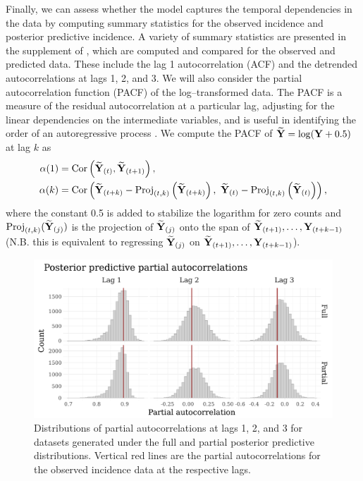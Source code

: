 Finally, we can assess whether the model captures the temporal dependencies in the data by computing summary statistics for the observed incidence and posterior predictive incidence. A variety of summary statistics are presented in the supplement of \cite{king2015avoidable}, which are computed and compared for the observed and predicted data. These include the lag 1 autocorrelation (ACF) and the detrended autocorrelations at lags 1, 2, and 3. We will also consider the partial autocorrelation function (PACF) of the log--transformed data. The PACF is a measure of the residual autocorrelation at a particular lag, adjusting for the linear dependencies on the intermediate variables, and is useful in identifying the order of an autoregressive process \cite{brockwell2013time}. We compute the PACF of $ \widetilde{\mathbf{Y}} = \log(\mathbf{Y} + 0.5) $ at lag $ k $ as 
\begin{align}
\label{eqn:lna_pacf}
\alpha(1)& =  \mathrm{Cor}\left (\widetilde{\mathbf{Y}}_{(t)}, \widetilde{\mathbf{Y}}_{(t+1)}\right ), \\
\alpha(k) &= \mathrm{Cor}\left (\widetilde{\mathbf{Y}}_{(t+k)} - \mathrm{Proj}_{(t,k)}\left (\widetilde{\mathbf{Y}}_{(t+k)}\right ),\ \widetilde{\mathbf{Y}}_{(t)} - \mathrm{Proj}_{(t,k)}\left (\widetilde{\mathbf{Y}}_{(t)}\right )\right ),
\end{align}
where the constant 0.5 is added to stabilize the logarithm for zero counts and $ \mathrm{Proj}_{(t,k)}(\widetilde{\mathbf{Y}}_{(j)}) $ is the projection of $ \widetilde{\mathbf{Y}}_{(j)} $ onto the span of $ \widetilde{\mathbf{Y}}_{(t+1)},\dots,\mathbf{Y}_{(t+k-1)} $ (N.B. this is equivalent to regressing $ \widetilde{\mathbf{Y}}_{(j)} $ on $ \widetilde{\mathbf{Y}}_{(t+1)},\dots,\mathbf{Y}_{(t+k-1)} $).  

\begin{figure}[htbp]
	\centering
	\includegraphics[width=0.9\linewidth]{figures/sir_pacf_plots}
	\caption[Posterior predictive distributions of partial autocorrelations at various lags.]{Distributions of partial autocorrelations at lags 1, 2, and 3 for datasets generated under the full and partial posterior predictive distributions. Vertical red lines are the partial autocorrelations for the observed incidence data at the respective lags.}
	\label{fig:sirpacfplots}
\end{figure}

